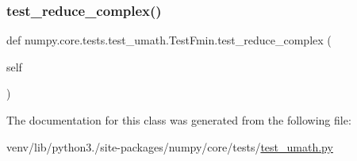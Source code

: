 \subsubsection{\texorpdfstring{test\+\_\+reduce\+\_\+complex()}{test\_reduce\_complex()}}
{\footnotesize\ttfamily def numpy.\+core.\+tests.\+test\+\_\+umath.\+Test\+Fmin.\+test\+\_\+reduce\+\_\+complex (\begin{DoxyParamCaption}\item[{}]{self }\end{DoxyParamCaption})}



The documentation for this class was generated from the following file\+:\begin{DoxyCompactItemize}
\item 
venv/lib/python3./site-\/packages/numpy/core/tests/\hyperlink{test__umath_8py}{test\+\_\+umath.\+py}\end{DoxyCompactItemize}
